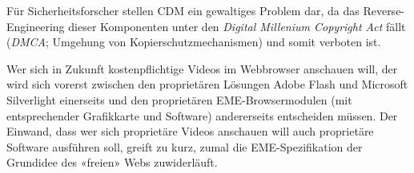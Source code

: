 \documentclass[a4paper,11pt]{scrartcl}
\begin{document}
Für Sicherheitsforscher stellen CDM ein gewaltiges Problem dar, da das Reverse-Engineering dieser Komponenten unter den \textit{Digital Millenium Copyright Act} fällt (\textit{DMCA}; Umgehung von Kopierschutzmechanismen) und somit verboten ist.

Wer sich in Zukunft kostenpflichtige Videos im Webbrowser anschauen will, der wird sich vorerst zwischen den proprietären Lösungen Adobe Flash und Microsoft Silverlight einerseits und den proprietären EME-Browsermodulen (mit entsprechender Grafikkarte und Software) andererseits entscheiden müssen. Der Einwand, dass wer sich proprietäre Videos anschauen will auch proprietäre Software ausführen soll, greift zu kurz, zumal die EME-Spezifikation der Grundidee des «freien» Webs zuwiderläuft. 



\end{document}
